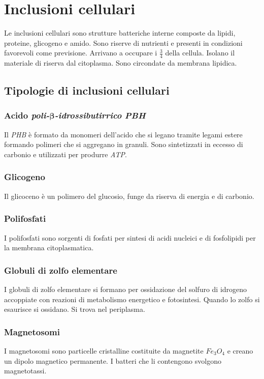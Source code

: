 \section{Inclusioni cellulari}
Le inclusioni cellulari sono strutture batteriche interne composte da lipidi, proteine, glicogeno e amido.
Sono riserve di nutrienti e presenti in condizioni favorevoli come previsione.
Arrivano a occupare i $\frac{3}{4}$ della cellula.
Isolano il materiale di riserva dal citoplasma.
Sono circondate da membrana lipidica.
	
	\subsection{Tipologie di inclusioni cellulari}

		\subsubsection{Acido \emph{poli-$\mathbf{\beta}$-idrossibutirrico} \emph{PBH}}
		Il \emph{PHB} \`e formato da monomeri dell'acido che si legano tramite legami estere formando polimeri che si aggregano in granuli.
		Sono sintetizzati in eccesso di carbonio e utilizzati per produrre \emph{ATP}.
		
		\subsubsection{Glicogeno}
		Il glicoceno \`e un polimero del glucosio, funge da riserva di energia e di carbonio.

		\subsubsection{Polifosfati}
		I polifosfati sono sorgenti di fosfati per sintesi di acidi nucleici e di fosfolipidi per la membrana citoplasmatica.


		\subsubsection{Globuli di zolfo elementare}
		I globuli di zolfo elementare si formano per ossidazione del solfuro di idrogeno accoppiate con reazioni di metabolismo energetico e fotosintesi.
		Quando lo zolfo si esaurisce si ossidano.
		Si trova nel periplasma.


		\subsubsection{Magnetosomi}
		I magnetosomi sono particelle cristalline costituite da magnetite \emph{$Fe_3O_4$} e creano un dipolo magnetico permanente.
			I batteri che li contengono svolgono magnetotassi.


